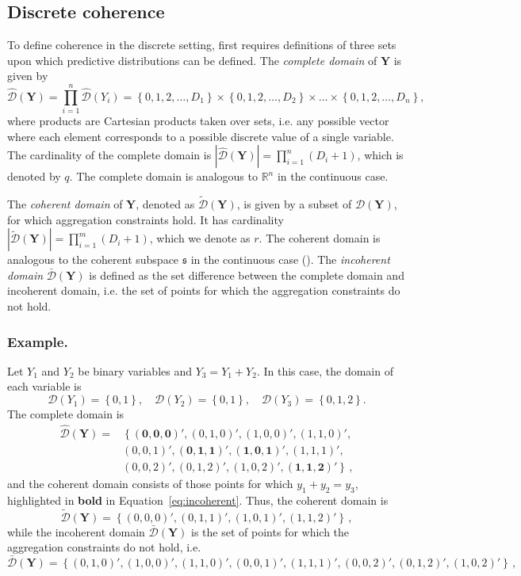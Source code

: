 \documentclass[a4paper,review,12pt,authoryear]{elsarticle}
\newcommand{\bY}{\mathbf{Y}}
\theoremstyle{definition}
\begin{document}
\subsection{Discrete coherence}\label{sec:domains}

To define coherence in the discrete setting, first requires definitions of three sets upon which predictive distributions can be defined. The \textit{complete domain} of $\bY$ is given by
\[
\hat{\mathcal D}(\bY)=\prod\limits_{i=1}^n\hat{\mathcal D}(Y_i)=\left\{0, 1,2,\dots,D_1\right\}\times\left\{0,1,2,\dots,D_2\right\}\times\dots\times\left\{0,1,2,\dots,D_n\right\},
\]
where products are Cartesian products taken over sets, i.e. any possible vector where each element corresponds to a possible discrete value of a single variable.
The cardinality of the complete domain is $|\hat{\mathcal D}(\bY)|=\prod\limits_{i=1}^{n} (D_i+1)$, which is denoted by $q$.
The complete domain is analogous to $\mathbb{R}^n$ in the continuous case.

The \textit{coherent domain} of $\bY$, denoted as $\tilde{\mathcal D}(\bY)$, is given by a subset of $\hat{\mathcal D}(\bY)$, for which aggregation constraints hold.
It has cardinality $|\tilde{\mathcal D}(\bY)|=\prod\limits_{i=1}^{m} (D_i+1)$, which we denote as $r$.
The coherent domain is analogous to the coherent subspace $\mathfrak{s}$ in the continuous case (\citealp{panagiotelisProbabilisticForecastReconciliation2022}). The \textit{incoherent domain} $\bar{\mathcal D}(\bY)$ is defined as the set difference between the complete domain and incoherent domain, i.e. the set of points for which the aggregation constraints do not hold.

  \subsubsection*{\textbf{Example}.}
  \label{sec:example}

  Let $Y_1$ and $Y_2$ be binary variables and $Y_3=Y_1+Y_2$. In this case, the domain of each variable is
  \[
    \mathcal{D}(Y_1)=\left\{0,1\right\},\quad
    \mathcal{D}(Y_2)=\left\{0,1\right\},\quad
    \mathcal{D}(Y_3)=\left\{0,1,2\right\}.
  \]
  The complete domain is
  \begin{equation}
  \begin{aligned}
  \hat{\mathcal D}(\bY)=&\left\{\mathbf{(0,0,0)'},(0,1,0)',(1,0,0)',(1,1,0)',\right.\\
  &\left.(0,0,1)',\mathbf{(0,1,1)'},\mathbf{(1,0,1)'},(1,1,1)',\right.\\
  &\left.(0,0,2)',(0,1,2)',(1,0,2)',\mathbf{(1,1,2)'}\right\}\,,
  \end{aligned}
  \label{eq:incoherent}
  \end{equation}
  and the coherent domain consists of those points for which $y_1+y_2=y_3$, highlighted in \textbf{bold} in Equation~\eqref{eq:incoherent}. Thus, the coherent domain is
  \[
      \tilde{\mathcal D}(\bY)=\left\{(0,0,0)',(0,1,1)',(1,0,1)',(1,1,2)'\right\}\,,
  \]
  while the incoherent domain $\bar{\mathcal D}(\bY)$ is the set of points for which the aggregation constraints do not hold, i.e.
    \[
  \bar{\mathcal D}(\bY)=\left\{(0,1,0)',(1,0,0)',(1,1,0)',(0,0,1)',
  (1,1,1)',(0,0,2)',(0,1,2)',(1,0,2)'
  \right\}\,,
  \]
  
\end{document}

